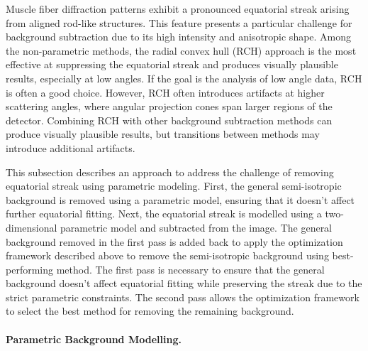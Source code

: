 \documentclass[iucr]{iucrjournals}
\begin{document}
Muscle fiber diffraction patterns exhibit a pronounced equatorial streak arising from aligned rod-like structures. This feature presents a particular challenge for background subtraction due to its high intensity and anisotropic shape. Among the non-parametric methods, the radial convex hull (RCH) approach is the most effective at suppressing the equatorial streak and produces visually plausible results, especially at low angles. If the goal is the analysis of low angle data, RCH is often a good choice. However, RCH often introduces artifacts at higher scattering angles, where angular projection cones span larger regions of the detector. Combining RCH with other background subtraction methods can produce visually plausible results, but transitions between methods may introduce additional artifacts. 

This subsection describes an approach to address the challenge of removing equatorial streak using parametric modeling. First, the general semi-isotropic background is removed using a parametric model, ensuring that it doesn't affect further equatorial fitting. Next, the equatorial streak is modelled using a two-dimensional parametric model and subtracted from the image. The general background removed in the first pass is added back to apply the optimization framework described above to remove the semi-isotropic background using best-performing method. The first pass is necessary to ensure that the general background doesn't affect equatorial fitting while preserving the streak due to the strict parametric constraints. The second pass allows the optimization framework to select the best method for removing the remaining background.


\paragraph{Parametric Background Modelling.}
\end{document}
